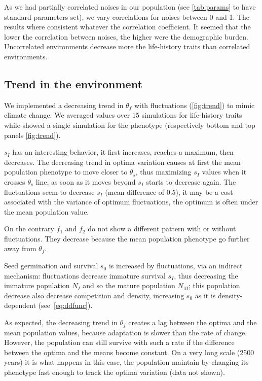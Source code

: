 As we had partially correlated noises in our population (see \autoref{tab:params} to have standard parameters set), we vary correlations for noises between 0 and 1. The results where consistent whatever the correlation coefficient. It seemed that the lower the correlation between noises, the higher were the demographic burden. Uncorrelated environments decrease more the life-history traits than correlated environments.

\subsection*{Trend in the environment}

We implemented a decreasing trend in $\theta_f$ with fluctuations (\autoref{fig:trend}) to mimic climate change.
We averaged values over 15 simulations for life-history traits while showed a single simulation for the phenotype (respectively bottom and top panels \autoref{fig:trend}).

$s_I$ has an interesting behavior, it first increases, reaches a maximum, then decreases. The decreasing trend in optima variation causes at first the mean population phenotype to move closer to $\theta_s$, thus maximizing $s_I$ values when it crosses $\theta_s$ line, as soon as it moves beyond $s_I$ starts to decrease again. The fluctuations seem to decrease $s_I$ (mean difference of 0.5), it may be a cost associated with the variance of optimum fluctuations, the optimum is often under the mean population value.

On the contrary $f_1$ and $f_2$ do not show a different pattern with or without fluctuations. They decrease because the mean population phenotype go further away from $\theta_f$.

Seed germination and survival $s_0$ is increased by fluctuations, via an indirect mechanism: fluctuations decrease immature survival $s_I$, thus decreasing the immature population $N_I$ and so the mature population $N_M$; this population decrease also decrease competition and density, increasing $s_0$ as it is density-dependent (see~\autoref{eq:ddfunc}).

As expected, the decreasing trend in $\theta_f$ creates a lag between the optima and the mean population values, because adaptation is slower than the rate of change. However, the population can still survive with such a rate if the difference between the optima and the means become constant. On a very long scale (2500 years) it is what happens in this case, the population maintain by changing its phenotype fast enough to track the optima variation (data not shown).

